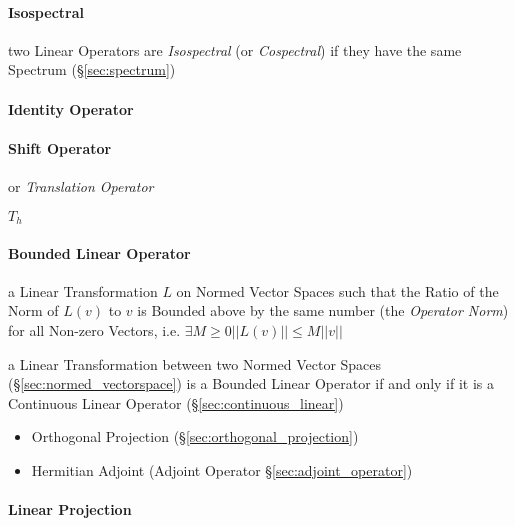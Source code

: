 \paragraph{Isospectral}\label{sec:isospectral}\hfill

two Linear Operators are \emph{Isospectral} (or \emph{Cospectral}) if they have
the same Spectrum (\S\ref{sec:spectrum})



\paragraph{Identity Operator}\label{sec:identity_operator}\hfill

\paragraph{Shift Operator}\label{sec:shift_operator}\hfill

or \emph{Translation Operator}

$T_h$



\paragraph{Bounded Linear Operator}\label{sec:bounded_linear_operator}\hfill

a Linear Transformation $L$ on Normed Vector Spaces such that the Ratio of the
Norm of $L(v)$ to $v$ is Bounded above by the same number (the \emph{Operator
  Norm}) for all Non-zero Vectors, i.e. $\exists M \geq 0 ||L(v)|| \leq M||v||$

a Linear Transformation between two Normed Vector Spaces
(\S\ref{sec:normed_vectorspace}) is a Bounded Linear Operator if and
only if it is a Continuous Linear Operator
(\S\ref{sec:continuous_linear})

\begin{itemize}
  \item Orthogonal Projection (\S\ref{sec:orthogonal_projection})
  \item Hermitian Adjoint (Adjoint Operator \S\ref{sec:adjoint_operator})
\end{itemize}



\paragraph{Linear Projection}\label{sec:projection}\hfill

